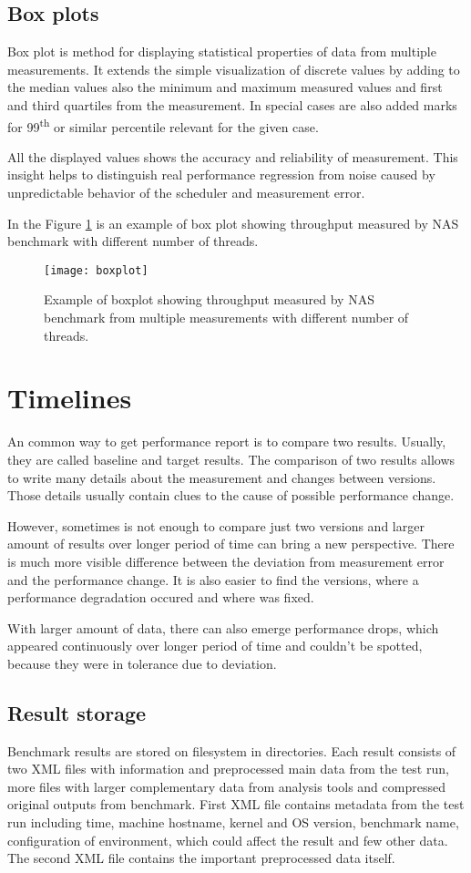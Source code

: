 \section{Box plots}
Box plot is method for displaying statistical properties of data from multiple
measurements. It extends the simple visualization of discrete values by adding
to the median values also the minimum and maximum measured values and first and
third quartiles from the measurement. In special cases are also added marks for
99\textsuperscript{th} or similar percentile relevant for the given case.

All the displayed values shows the accuracy and reliability of measurement. This
insight helps to distinguish real performance regression from noise caused by
unpredictable behavior of the scheduler and measurement error.

In the Figure \ref{fig:boxplot} is an example of box plot showing throughput
measured by NAS benchmark with different number of threads.  

\begin{figure}
  \centering
  \texttt{[image: boxplot]}
  \caption{Example of boxplot showing throughput measured by NAS benchmark from
    multiple measurements with different number of threads.}
  \label{fig:boxplot}
\end{figure}


\chapter{Timelines}
An common way to get performance report is to compare two results. Usually, they
are called baseline and target results. The comparison of two results allows to
write many details about the measurement and changes between versions. Those
details usually contain clues to the cause of possible performance change.

However, sometimes is not enough to compare just two versions and larger amount
of results over longer period of time can bring a new perspective. There is much
more visible difference between the deviation from measurement error and the
performance change. It is also easier to find the versions, where a
performance degradation occured and where was fixed.

With larger amount of data, there can also emerge performance drops, which
appeared continuously over longer period of time and couldn't be spotted,
because they were in tolerance due to deviation.

\section{Result storage}
Benchmark results are stored on filesystem in directories. Each result consists
of two XML files with information and preprocessed main data from the test run,
more files with larger complementary data from analysis tools and compressed
original outputs from benchmark. First XML file contains metadata from the test
run including time, machine hostname, kernel and OS version, benchmark name,
configuration of environment, which could affect the result and few other data.
The second XML file contains the important preprocessed data itself.

